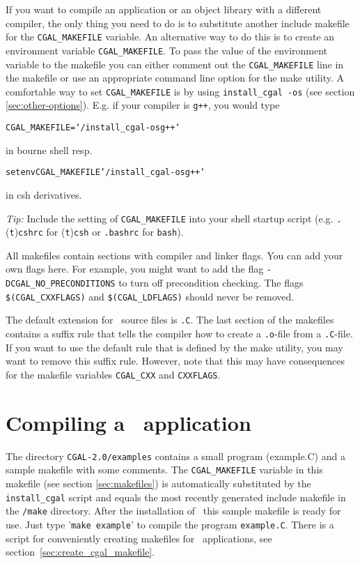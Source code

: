 If you want to compile an application or an object library with a
different compiler, the only thing you need to do is to substitute
another include makefile for the \texttt{CGAL\_MAKEFILE} variable. An
alternative way to do this is to create an environment variable
\texttt{CGAL\_MAKEFILE}. To pass the value of the environment variable
to the makefile you can either comment out the \texttt{CGAL\_MAKEFILE}
line in the makefile or use an appropriate command line option for the
make utility.  A comfortable way to set \texttt{CGAL\_MAKEFILE} is by
using \texttt{install\_cgal~-os} (see section
\ref{sec:other-options}).  E.g. if your compiler is \texttt{g++}, you
would type
\begin{alltt}
CGAL_MAKEFILE=`\yourcgaldir/install_cgal -os g++`
\end{alltt}
in bourne shell resp.
\begin{alltt}
setenv CGAL_MAKEFILE `\yourcgaldir/install_cgal -os g++`
\end{alltt}
in csh derivatives. 

\textit{Tip:} Include the setting of \texttt{CGAL\_MAKEFILE} into your
shell startup script (e.g. \texttt{.}(\texttt{t})\texttt{cshrc} for
(\texttt{t})\texttt{csh} or \texttt{.bashrc} for \texttt{bash}).

All makefiles contain sections with compiler and linker flags.  You
can add your own flags here. For example, you might want to add the
flag \texttt{-DCGAL\_NO\_PRECONDITIONS} to turn off precondition
checking. The flags \texttt{\$(CGAL\_CXXFLAGS)} and
\texttt{\$(CGAL\_LDFLAGS)} should never be removed.

The default extension for \cgal\ source files is \texttt{.C}.  The
last section of the makefiles contains a suffix rule that tells the
compiler how to create a \texttt{.o}-file from a \texttt{.C}-file.  If
you want to use the default rule that is defined by the make utility,
you may want to remove this suffix rule.  However, note that this may
have consequences for the makefile variables \texttt{CGAL\_CXX} and
\texttt{CXXFLAGS}.

\section{Compiling a \cgal\ application}
The directory \texttt{CGAL-2.0/examples} contains a small program
(example.C) and a sample makefile with some comments. The
\texttt{CGAL\_MAKEFILE} variable in this makefile (see section
\ref{sec:makefiles}) is automatically substituted by the
\texttt{install\_cgal} script and equals the most recently generated
include makefile in the \texttt{\cgaldir/make} directory. After the
installation of \cgal\ this sample makefile is ready for use. Just
type '\texttt{make example}' to compile the program
\texttt{example.C}. There is a script for conveniently creating
makefiles for \cgal\ applications, see
section~\ref{sec:create_cgal_makefile}.


